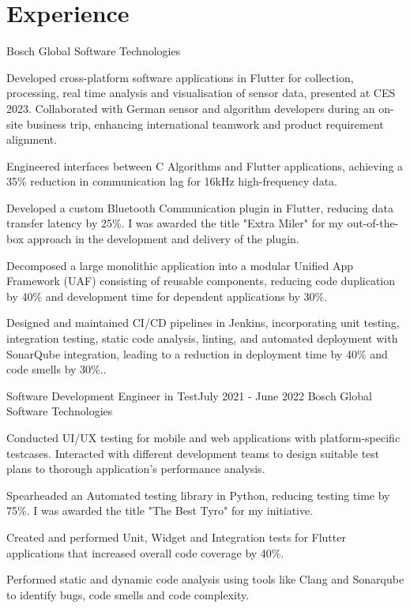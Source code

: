 \section{Experience}
\resumeSubHeadingListStart
    {Bosch Global Software Technologies}{}
    \resumeItemListStart
          {
\item Developed cross-platform software applications in Flutter for collection, processing, real time analysis and visualisation of sensor data, presented at CES 2023. Collaborated with German sensor and algorithm developers during an on-site business trip, enhancing international teamwork and product requirement alignment.
  \item Engineered interfaces between C Algorithms and Flutter applications, achieving a 35\% reduction in communication lag for 16kHz high-frequency data.
  \item Developed a custom Bluetooth Communication plugin in Flutter, reducing data transfer latency by 25\%. I was awarded the title "Extra Miler" for my out-of-the-box approach in the development and delivery of the plugin.
  \item  Decomposed a large monolithic application into a modular Unified App Framework (UAF) consisting of reusable components, reducing code duplication by 40\% and development time for dependent applications by 30\%. 
   \item Designed and maintained CI/CD pipelines in Jenkins, incorporating unit testing, integration testing, static code analysis, linting, and automated deployment with SonarQube integration, leading to a reduction in deployment time by 40\% and code smells by 30\%..

}      \resumeItemListEnd
\vspace{-1pt}

    \resumeSubheading
		{Software Development Engineer in Test}{July 2021 - June 2022}
		{Bosch Global Software Technologies}{}
		\resumeItemListStart
        \item Conducted UI/UX testing for mobile and web applications with platform-specific testcases. Interacted with different development teams to design suitable test plans to thorough application's performance analysis.
        \item Spearheaded an Automated testing library in Python, reducing testing time by 75\%. I was awarded the title "The Best Tyro" for my initiative.
        \item Created and performed Unit, Widget and Integration tests for Flutter applications that increased overall code coverage by 40\%.
        \item Performed static and dynamic code analysis using tools like Clang and Sonarqube to identify bugs, code smells and code complexity.
	\resumeItemListEnd
    \vspace{-1pt}
    
